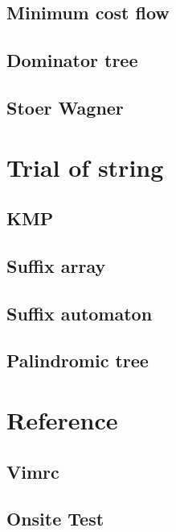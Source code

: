 \documentclass[UTF8,a4paper]{report}
\begin{document}
		\section{Minimum cost flow}
			
		\section{Dominator tree}
			
		\section{Stoer Wagner}
			
	\chapter{Trial of string}
		\section{KMP}
			
		\section{Suffix array}
			
		\section{Suffix automaton}
			
		\section{Palindromic tree}
			
	\chapter{Reference}
		\section{Vimrc}
			
		\section{Onsite Test}
			
\end{document}
